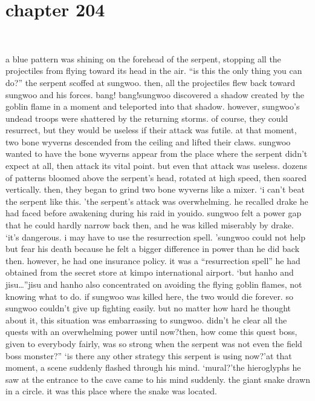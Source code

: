 \section{chapter 204}

                             




a blue pattern was shining on the forehead of the serpent, stopping all the projectiles from flying toward its head in the air.
“is this the only thing you can do?” the serpent scoffed at sungwoo.
then, all the projectiles flew back toward sungwoo and his forces.
bang! bang!sungwoo discovered a shadow created by the goblin flame in a moment and teleported into that shadow.
however, sungwoo’s undead troops were shattered by the returning storms.
of course, they could resurrect, but they would be useless if their attack was futile.
at that moment, two bone wyverns descended from the ceiling and lifted their claws.
sungwoo wanted to have the bone wyverns appear from the place where the serpent didn’t expect at all, then attack its vital point.
but even that attack was useless.
dozens of patterns bloomed above the serpent’s head, rotated at high speed, then soared vertically.
 then, they began to grind two bone wyverns like a mixer.
‘i can’t beat the serpent like this.
’the serpent’s attack was overwhelming.
 he recalled drake he had faced before awakening during his raid in youido.
 sungwoo felt a power gap that he could hardly narrow back then, and he was killed miserably by drake.
‘it’s dangerous.
 i may have to use the resurrection spell.
’sungwoo could not help but fear his death because he felt a bigger difference in power than he did back then.
however, he had one insurance policy.
 it was a “resurrection spell” he had obtained from the secret store at kimpo international airport.
‘but hanho and jisu…”jisu and hanho also concentrated on avoiding the flying goblin flames, not knowing what to do.
 if sungwoo was killed here, the two would die forever.
so sungwoo couldn’t give up fighting easily.
but no matter how hard he thought about it, this situation was embarrassing to sungwoo.
didn’t he clear all the quests with an overwhelming power until now?then, how come this quest boss, given to everybody fairly, was so strong when the serpent was not even the field boss monster?”
‘is there any other strategy this serpent is using now?’at that moment, a scene suddenly flashed through his mind.
‘mural?’the hieroglyphs he saw at the entrance to the cave came to his mind suddenly.
the giant snake drawn in a circle.
 it was this place where the snake was located.
